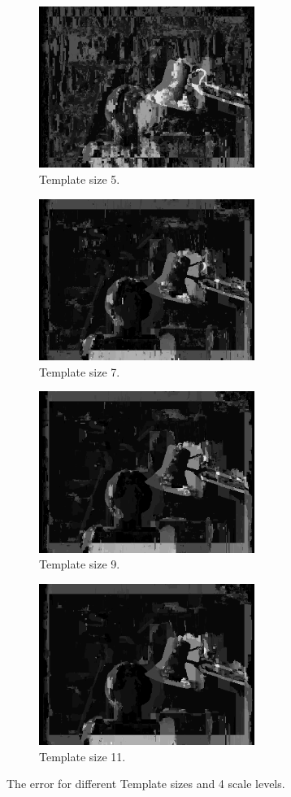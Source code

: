 \documentclass[12pt,a4paper,oneside,final]{article}
\begin{document}
\begin{table}[H]
\begin{subtable}{1\textwidth}
	\begin{figure}[H]
		\centering
		\begin{subfigure}[b]{0.5\textwidth}
			\centering
			\includegraphics[width=7cm]{err_s4_k5set_1.png}
			\caption{Template size 5.}
		\end{subfigure}%
		\begin{subfigure}[b]{0.5\textwidth}
			\centering
			\includegraphics[width=7cm]{err_s4_k7set_1.png}
			\caption{Template size 7.}
		\end{subfigure}
		\begin{subfigure}[b]{0.5\textwidth}
			\centering
			\includegraphics[width=7cm]{err_s4_k9set_1.png}
			\caption{Template size 9.}
		\end{subfigure}%
		\begin{subfigure}[b]{0.5\textwidth}
			\centering
			\includegraphics[width=7cm]{err_s4_k11set_1.png}
			\caption{Template size 11.}
		\end{subfigure}
		\caption{The error for different Template sizes and 4 scale levels.}
		\label{fig:error}
	\end{figure}
	

\end{subtable}
\end{table}
\end{document}
